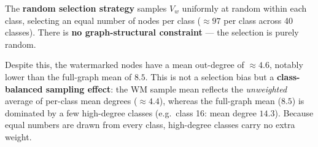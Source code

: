 \documentclass[11pt]{article}
\begin{document}
The \textbf{random selection strategy} samples \(V_w\) uniformly at
random within each class, selecting an equal number of nodes per class
(\(\approx 97\) per class across 40 classes). There is \textbf{no
graph-structural constraint} --- the selection is purely random.

Despite this, the watermarked nodes have a mean out-degree of
\(\approx 4.6\), notably lower than the full-graph mean of \(8.5\). This
is not a selection bias but a \textbf{class-balanced sampling effect}:
the WM sample mean reflects the \emph{unweighted} average of per-class
mean degrees (\(\approx 4.4\)), whereas the full-graph mean (\(8.5\)) is
dominated by a few high-degree classes (e.g.~class 16: mean degree
\(14.3\)). Because equal numbers are drawn from every class, high-degree
classes carry no extra weight.
\end{document}
